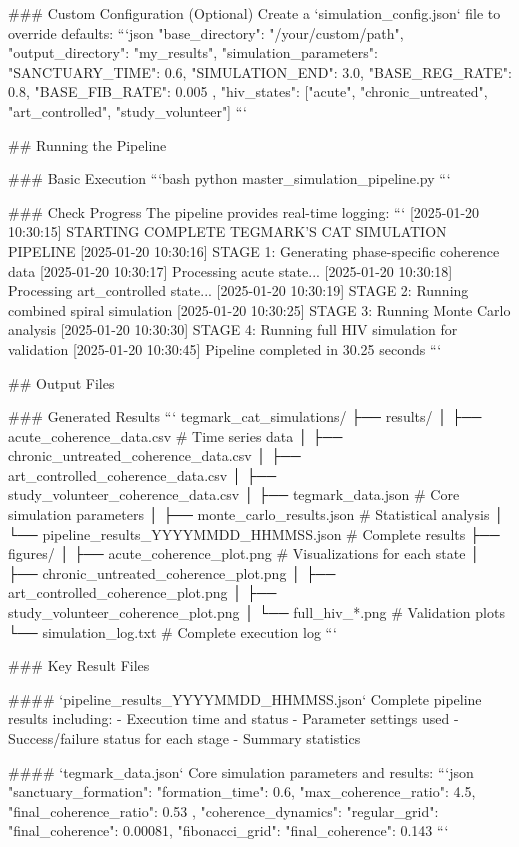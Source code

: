 ### Custom Configuration (Optional)
Create a `simulation_config.json` file to override defaults:
```json
{
  "base_directory": "/your/custom/path",
  "output_directory": "my_results",
  "simulation_parameters": {
    "SANCTUARY_TIME": 0.6,
    "SIMULATION_END": 3.0,
    "BASE_REG_RATE": 0.8,
    "BASE_FIB_RATE": 0.005
  },
  "hiv_states": ["acute", "chronic_untreated", "art_controlled", "study_volunteer"]
}
```

## Running the Pipeline

### Basic Execution
```bash
python master_simulation_pipeline.py
```

### Check Progress
The pipeline provides real-time logging:
```
[2025-01-20 10:30:15] STARTING COMPLETE TEGMARK'S CAT SIMULATION PIPELINE
[2025-01-20 10:30:16] STAGE 1: Generating phase-specific coherence data
[2025-01-20 10:30:17]   Processing acute state...
[2025-01-20 10:30:18]   Processing art_controlled state...
[2025-01-20 10:30:19] STAGE 2: Running combined spiral simulation
[2025-01-20 10:30:25] STAGE 3: Running Monte Carlo analysis
[2025-01-20 10:30:30] STAGE 4: Running full HIV simulation for validation
[2025-01-20 10:30:45] Pipeline completed in 30.25 seconds
```

## Output Files

### Generated Results
```
tegmark_cat_simulations/
├── results/
│   ├── acute_coherence_data.csv          # Time series data
│   ├── chronic_untreated_coherence_data.csv
│   ├── art_controlled_coherence_data.csv
│   ├── study_volunteer_coherence_data.csv
│   ├── tegmark_data.json                 # Core simulation parameters
│   ├── monte_carlo_results.json          # Statistical analysis
│   └── pipeline_results_YYYYMMDD_HHMMSS.json  # Complete results
├── figures/
│   ├── acute_coherence_plot.png          # Visualizations for each state
│   ├── chronic_untreated_coherence_plot.png
│   ├── art_controlled_coherence_plot.png
│   ├── study_volunteer_coherence_plot.png
│   └── full_hiv_*.png                    # Validation plots
└── simulation_log.txt                    # Complete execution log
```

### Key Result Files

#### `pipeline_results_YYYYMMDD_HHMMSS.json`
Complete pipeline results including:
- Execution time and status
- Parameter settings used
- Success/failure status for each stage
- Summary statistics

#### `tegmark_data.json`
Core simulation parameters and results:
```json
{
  "sanctuary_formation": {
    "formation_time": 0.6,
    "max_coherence_ratio": 4.5,
    "final_coherence_ratio": 0.53
  },
  "coherence_dynamics": {
    "regular_grid": {"final_coherence": 0.00081},
    "fibonacci_grid": {"final_coherence": 0.143}
  }
}
```

